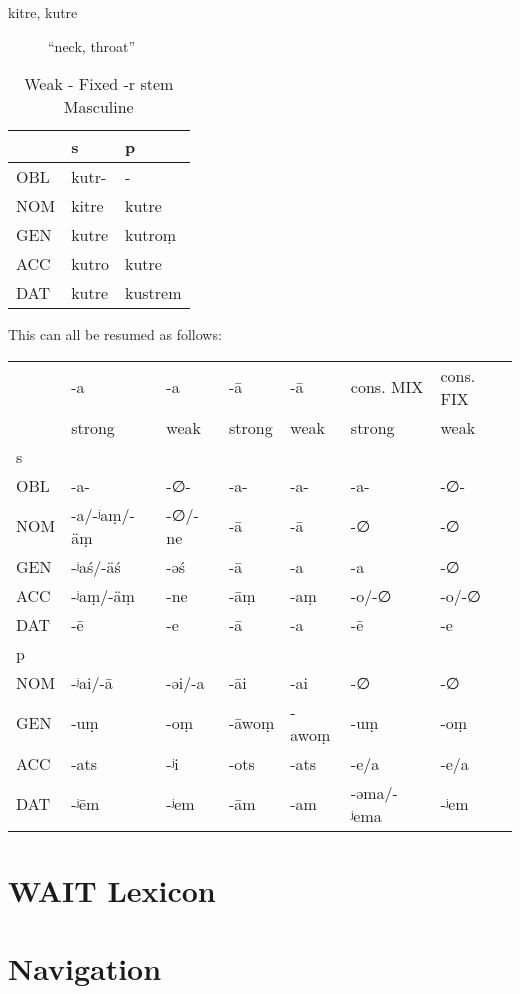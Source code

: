 \documentclass[11pt,a4paper]{article}
\begin{document}
\begin{enumerate}
\begin{description}
\item[{kitre, kutre}] ``neck, throat''
\end{description}
\begin{table}[htbp]
\caption{Weak - Fixed -r stem Masculine}
\centering
\begin{tabular}{lll}
 & s & p\\
\hline
OBL & kutr- & -\\
NOM & kitre & kutre\\
GEN & kutre & kutroṃ\\
ACC & kutro & kutre\\
DAT & kutre & kustrem\\
\end{tabular}
\end{table}

This can all be resumed as follows:

\begin{center}
\begin{tabular}{lllllll}
 & -a & -a & -ā & -ā & cons. MIX & cons. FIX\\
 & strong & weak & strong & weak & strong & weak\\
\hline
s &  &  &  &  &  & \\
OBL & -a- & -∅- & -a- & -a- & -a- & -∅-\\
NOM & -a/-ʲaṃ/-äṃ & -∅/-ne & -ā & -ā & -∅ & -∅\\
GEN & -ʲaś/-äś & -əś & -ā & -a & -a & -∅\\
ACC & -ʲaṃ/-äṃ & -ne & -āṃ & -aṃ & -o/-∅ & -o/-∅\\
DAT & -ē & -e & -ā & -a & -ē & -e\\
\hline
p &  &  &  &  &  & \\
NOM & -ʲai/-ā & -əi/-a & -āi & -ai & -∅ & -∅\\
GEN & -uṃ & -oṃ & -āwoṃ & -awoṃ & -uṃ & -oṃ\\
ACC & -ats & -ʲi & -ots & -ats & -e/a & -e/a\\
DAT & -ʲēm & -ʲem & -ām & -am & -əma/-ʲema & -ʲem\\
\end{tabular}
\end{center}
\end{enumerate}


\section{{\bfseries\sffamily WAIT} Lexicon}
\label{sec:org8b33103}

\section*{Navigation}
\label{sec:org13a7d34}
\end{document}

